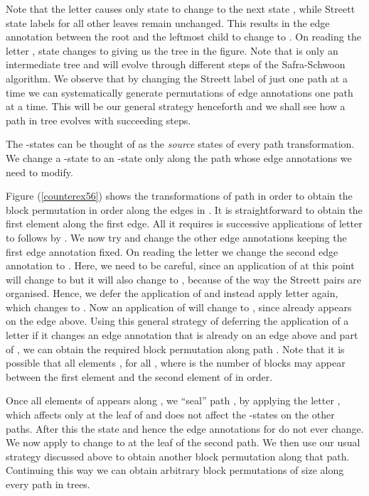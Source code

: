 \documentclass[3p]{elsarticle}
\begin{document}
Note that the letter  causes only state  to change to
the next state , while Streett state labels for all other leaves
remain unchanged. This results in the edge annotation between the root and the
leftmost child to change to . On reading the letter , state
 changes to  giving us the tree  in the figure. Note
that  is only an intermediate tree and will evolve through different steps
of the Safra-Schwoon algorithm.  We observe that by changing the Streett label
of just one path at a time we can systematically generate permutations of edge
annotations one path at a time.  This will be our general strategy henceforth
and we shall see how a path  in tree  evolves with succeeding steps. 

The -states can be thought of as the \emph{source} states of every
path transformation. We change a -state to an -state only along the
path whose edge annotations we need to modify.  

Figure (\ref{counterex56}) shows the transformations of path  in order to
obtain the block permutation  in order along the edges in . It is
straightforward to obtain the first element  along the first edge.
All it requires is successive applications of letter  to
 follows by .  We now try and change the other edge
annotations keeping the first edge annotation fixed. On reading the letter
 we change the second edge annotation to . Here,
we need to be careful, since an application of  at this point will
change  to  but it will also change  to ,
because of the way the Streett pairs are organised. Hence, we defer the
application of  and instead apply letter  again, which
changes  to . Now an application of  will change 
to , since  already appears on the edge above. Using this general
strategy of deferring the application of a letter if it changes an edge
annotation that is already on an edge above and part of , we can obtain the
required block permutation  along path . Note that it is possible
that all elements , for all , where  is
the number of blocks may appear between the first element  and the
second element  of  in order. 

Once all elements of  appears along , we ``seal'' path , by
applying the letter , which affects only  at the leaf of
 and does not affect the -states on the other paths. After this the
state  and hence the edge annotations for  do not ever
change. We now apply  to change  to  at the
leaf of the second path. We then use our usual strategy discussed above to
obtain another block permutation along that path. Continuing this way we can
obtain arbitrary block permutations of size  along every path in 
trees. 
\end{document}
